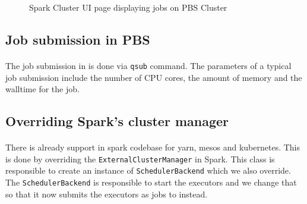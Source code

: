 \begin{figure}[h]
    \centering
    \caption{Spark Cluster UI page displaying jobs on PBS Cluster}
\end{figure}

\subsection{Job submission in PBS}
\paragraph{}
The job submission in  is done via \texttt{qsub} command. The
parameters of a typical job submission include the number of CPU cores, the
amount of memory and the \gls{walltime} for the job.

\subsection{Overriding Spark's cluster manager}
\paragraph{}
There is already support in \gls{spark} codebase for \gls{yarn}, \gls{mesos} and
\gls{kubernetes}. This is done by overriding the \texttt{ExternalClusterManager}
in Spark. This class is responsible to create an instance of
\texttt{SchedulerBackend} which we also override. The \texttt{SchedulerBackend}
is responsible to start the \glspl{executor} and we change that so that it
now submits the \glspl{executor} as jobs to  instead.

